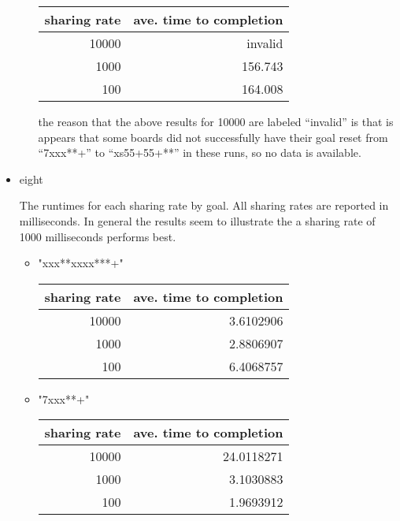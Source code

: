 \documentclass[11pt]{article}
\begin{document}
\begin{itemize}
\begin{itemize}
\begin{center}
\begin{tabular}{rr}
 sharing rate  &  ave. time to completion  \\
\hline
        10000  &                  invalid  \\
         1000  &                  156.743  \\
          100  &                  164.008  \\
\end{tabular}
\end{center}



the reason that the above results for 10000 are labeled ``invalid'' is
that is appears that some boards did not successfully have their goal
reset from ``7xxx**+'' to ``xs55+55+**'' in these runs, so no data is
available.

\end{itemize} %

\item eight\\
\label{sec-1.5.3.2}

The runtimes for each sharing rate by goal.  All sharing rates are
reported in milliseconds.  In general the results seem to illustrate
the a sharing rate of 1000 milliseconds performs best.
\begin{itemize}

\item "xxx**xxxx***+"\\
\label{sec-1.5.3.2.1}


\begin{center}
\begin{tabular}{rr}
 sharing rate  &  ave. time to completion  \\
\hline
        10000  &                3.6102906  \\
         1000  &                2.8806907  \\
          100  &                6.4068757  \\
\end{tabular}
\end{center}




\item "7xxx**+"\\
\label{sec-1.5.3.2.2}


\begin{center}
\begin{tabular}{rr}
 sharing rate  &  ave. time to completion  \\
\hline
        10000  &               24.0118271  \\
         1000  &                3.1030883  \\
          100  &                1.9693912  \\
\end{tabular}
\end{center}





\end{itemize}
\end{itemize}
\end{document}
